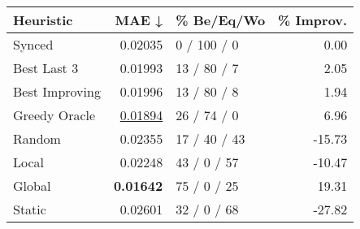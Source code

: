 \begin{tabular}{lrlr}
\toprule
\textbf{Heuristic} & \textbf{MAE ↓} & \textbf{\% Be/Eq/Wo} & \textbf{\% Improv.} \\
\midrule
            Synced &        0.02035 &          0 / 100 / 0 &                0.00 \\
\midrule
       Best Last 3 &        0.01993 &          13 / 80 / 7 &                2.05 \\
    Best Improving &        0.01996 &          13 / 80 / 8 &                1.94 \\
\addlinespace
     Greedy Oracle &        \underline{0.01894} &          26 / 74 / 0 &                6.96 \\
            Random &        0.02355 &         17 / 40 / 43 &              -15.73 \\
\midrule
             Local &        0.02248 &          43 / 0 / 57 &              -10.47 \\
            Global &        \textbf{0.01642} &          75 / 0 / 25 &               19.31 \\
\midrule
            Static &        0.02601 &          32 / 0 / 68 &              -27.82 \\
\bottomrule
\end{tabular}

\label{tab:non_lr05_le1_bs2_Summary}
